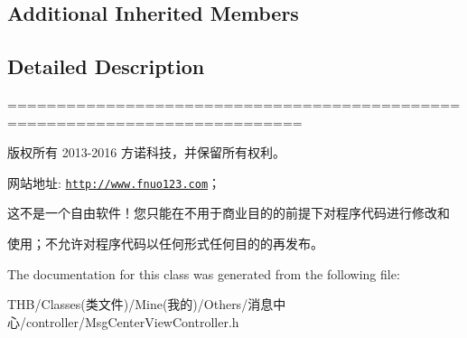 \subsection*{Additional Inherited Members}


\subsection{Detailed Description}
============================================================================

版权所有 2013-\/2016 方诺科技，并保留所有权利。

网站地址\+: \href{http://www.fnuo123.com}{\tt http\+://www.\+fnuo123.\+com}； 



这不是一个自由软件！您只能在不用于商业目的的前提下对程序代码进行修改和

使用；不允许对程序代码以任何形式任何目的的再发布。 

 

The documentation for this class was generated from the following file\+:\begin{DoxyCompactItemize}
\item 
T\+H\+B/\+Classes(类文件)/\+Mine(我的)/\+Others/消息中心/controller/Msg\+Center\+View\+Controller.\+h\end{DoxyCompactItemize}
